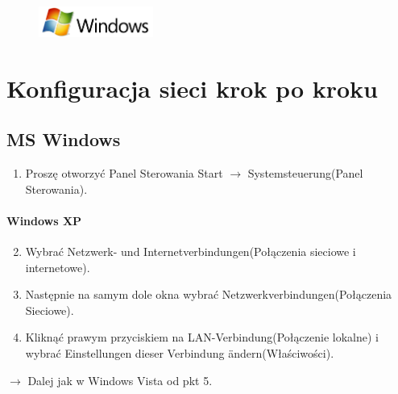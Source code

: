 \documentclass[a4paper,12pt]{scrartcl}
\begin{document}
\newpage
\enlargethispage{20pt}

\begin{figure}[t!]
    \raggedleft
    \vspace{-20pt}
    \includegraphics[height=1cm,keepaspectratio]{Bilder/Windows_logo}
    \vspace{-20pt}
\end{figure}

\section*{Konfiguracja sieci krok po kroku}
\subsection*{MS Windows}
\begin{enumerate}
    \item Proszę otworzyć Panel Sterowania Start $\rightarrow$ Systemsteuerung(Panel Sterowania).
\end{enumerate}
\vspace{-15pt}
\paragraph*{Windows XP}
\begin{enumerate}
     \setcounter{enumi}{1}
     \item Wybrać Netzwerk- und Internetverbindungen(Połączenia sieciowe i internetowe).
     \item Następnie na samym dole okna wybrać Netzwerkverbindungen(Połączenia Sieciowe).
     \item Kliknąć prawym przyciskiem na LAN-Verbindung(Połączenie lokalne) i wybrać Einstellungen dieser Verbindung ändern(Właściwości).
\end{enumerate}
$\rightarrow$ Dalej jak w Windows Vista od pkt 5.
\vspace{-10pt}
\end{document}
